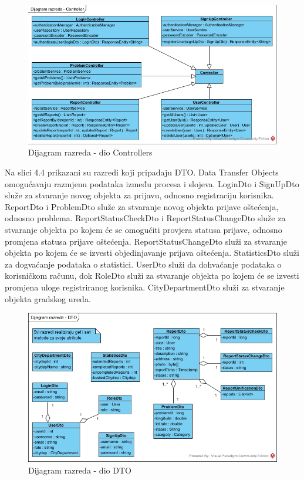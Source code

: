 \begin{figure}[H]
	\includegraphics[scale=0.60]{slike/DR-controller} %
	\centering
	\caption{Dijagram razreda - dio Controllers}
	\label{fig:DijagramRazredaControllers}
\end{figure}

Na slici 4.4 prikazani su razredi koji pripadaju DTO. Data Transfer Objects omogućavaju
razmjenu podataka između procesa i slojeva. LoginDto i SignUpDto služe za stvaranje novog objekta
za prijavu, odnosno registraciju korisnika. ReportDto i ProblemDto služe za stvaranje novog objekta
prijave oštećenja, odnosno problema. ReportStatusCheckDto i ReportStatusChangeDto služe za stvaranje 
objekta po kojem će se omogućiti provjera statusa prijave, odnosno promjena statusa prijave oštećenja.
ReportStatusChangeDto služi za stvaranje objekta po kojem će se izvesti objedinjavanje prijava oštećenja.
StatisticsDto služi za dogvaćanje podataka o statistici. UserDto
služi da dohvaćanje podataka o korisničkom računu, dok RoleDto služi za stvaranje objekta po kojem
će se izvesti promjena uloge registriranog korisnika. CityDepartmentDto služi za stvaranje objekta
gradskog ureda. 

\begin{figure}[H]
	\includegraphics[scale=0.60]{slike/DR-DTO.jpg} %
	\centering
	\caption{Dijagram razreda - dio DTO}
	\label{fig:DijagramRazredaDTO}
\end{figure}


